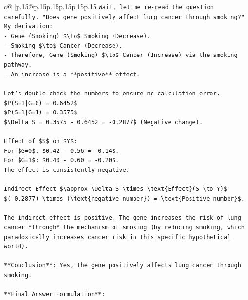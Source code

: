 \documentclass{article}
\begin{document}
{\begin{supertabular}{c@{$\;$}|p{.15\linewidth}@{}p{.15\linewidth}p{.15\linewidth}p{.15\linewidth}p{.15\linewidth}p{.15\linewidth}}
{{{\texttt{Wait, let me re{-}read the question carefully. "Does gene positively affect lung cancer through smoking?"} \\
\texttt{My derivation:} \\
\texttt{{-} Gene (Smoking) \$\textbackslash{}to\$ Smoking (Decrease).} \\
\texttt{{-} Smoking \$\textbackslash{}to\$ Cancer (Decrease).} \\
\texttt{{-} Therefore, Gene (Smoking) \$\textbackslash{}to\$ Cancer (Increase) via the smoking pathway.} \\
\texttt{{-} An increase is a **positive** effect.} \\
\\ 
\texttt{Let's double check the numbers to ensure no calculation error.} \\
\texttt{\$P(S=1|G=0) = 0.6452\$} \\
\texttt{\$P(S=1|G=1) = 0.3575\$} \\
\texttt{\$\textbackslash{}Delta S = 0.3575 {-} 0.6452 = {-}0.2877\$ (Negative change).} \\
\\ 
\texttt{Effect of \$S\$ on \$Y\$:} \\
\texttt{For \$G=0\$: \$0.42 {-} 0.56 = {-}0.14\$.} \\
\texttt{For \$G=1\$: \$0.40 {-} 0.60 = {-}0.20\$.} \\
\texttt{The effect is consistently negative.} \\
\\ 
\texttt{Indirect Effect \$\textbackslash{}approx \textbackslash{}Delta S \textbackslash{}times \textbackslash{}text\{Effect\}(S \textbackslash{}to Y)\$.} \\
\texttt{\$({-}0.2877) \textbackslash{}times (\textbackslash{}text\{negative number\}) = \textbackslash{}text\{Positive number\}\$.} \\
\\ 
\texttt{The indirect effect is positive. The gene increases the risk of lung cancer *through* the mechanism of smoking (by reducing smoking, which paradoxically increases cancer risk in this specific hypothetical world).} \\
\\ 
\texttt{**Conclusion**: Yes, the gene positively affects lung cancer through smoking.} \\
\\ 
\texttt{**Final Answer Formulation**:} \\
}}}
\end{supertabular}}
\end{document}
